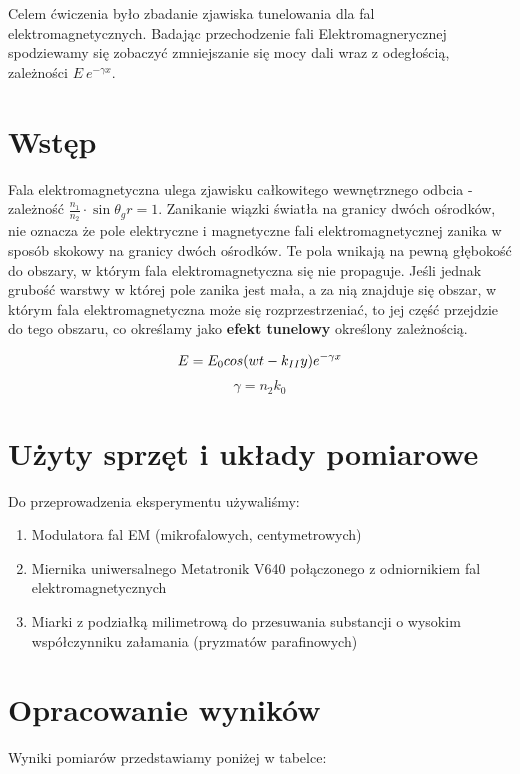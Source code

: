 \documentclass[a4paper,12pt]{article}
\begin{document}
Celem ćwiczenia było zbadanie zjawiska tunelowania dla fal elektromagnetycznych. Badając przechodzenie fali Elektromagnerycznej spodziewamy się zobaczyć zmniejszanie się mocy dali wraz z odegłością, zależności $E~e^{-\gamma x}$. 

\section{Wstęp}

Fala elektromagnetyczna ulega zjawisku całkowitego wewnętrznego odbcia - zależność $\frac{n_1}{n_2}\cdot \sin \theta_gr = 1 $. Zanikanie wiązki światła na granicy dwóch ośrodków, nie oznacza że pole elektryczne i magnetyczne fali elektromagnetycznej zanika w sposób skokowy na granicy dwóch ośrodków. Te pola wnikają na pewną głębokość do obszary, w którym fala elektromagnetyczna się nie propaguje. 
Jeśli jednak grubość warstwy w której pole zanika jest mała, a za nią znajduje się obszar, w którym fala elektromagnetyczna może się rozprzestrzeniać, to jej część przejdzie do tego obszaru, co określamy jako \textbf{efekt tunelowy} określony zależnością.


$$
E = E_0cos(wt-k_{II}y)e^{-\gamma x} \\
$$
$$
\gamma = n_2k_0
$$

\section{Użyty sprzęt i układy pomiarowe}

Do przeprowadzenia eksperymentu używaliśmy: 

\begin{enumerate}
  \item Modulatora fal EM (mikrofalowych, centymetrowych) 
  \item Miernika uniwersalnego Metatronik V640 połączonego z odniornikiem fal elektromagnetycznych
  \item Miarki z podziałką milimetrową do przesuwania substancji o wysokim współczynniku załamania  (pryzmatów parafinowych)
  
\end{enumerate}


\section{Opracowanie wyników}

Wyniki pomiarów przedstawiamy poniżej w tabelce:
\end{document}
